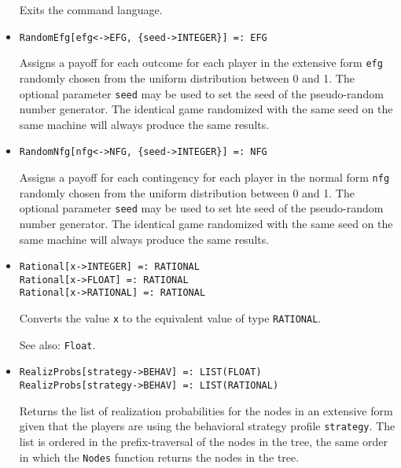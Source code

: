 \begin{itemize}
\bd
Exits the command language.
\ed


\item
\protect \large \begin{verbatim}
RandomEfg[efg<->EFG, {seed->INTEGER}] =: EFG
\end{verbatim}\normalsize

\bd
Assigns a payoff for each outcome for each player in the
extensive form \verb+efg+ randomly chosen from the uniform distribution
between 0 and 1.  The optional parameter \verb+seed+ may be used to
set the seed of the pseudo-random number generator.  The identical game
randomized with the same seed on the same machine will always produce
the same results.
\ed

\item
\protect \large \begin{verbatim}
RandomNfg[nfg<->NFG, {seed->INTEGER}] =: NFG
\end{verbatim}\normalsize

\bd
Assigns a payoff for each contingency for each player in
the normal form \verb+nfg+ randomly chosen from the uniform distribution
between 0 and 1.  The optional parameter \verb+seed+ may be used to
set hte seed of the pseudo-random number generator.  The identical game
randomized with the same seed on the same machine will always produce
the same results.
\ed

\item
\protect \large \begin{verbatim}
Rational[x->INTEGER] =: RATIONAL
Rational[x->FLOAT] =: RATIONAL
Rational[x->RATIONAL] =: RATIONAL
\end{verbatim} \normalsize

\bd
Converts the value \verb+x+ to the equivalent value of
type {\tt RATIONAL}.
\item
[See also:] {\tt Float}.
\ed

\item
\protect \large \begin{verbatim}
RealizProbs[strategy->BEHAV] =: LIST(FLOAT)
RealizProbs[strategy->BEHAV] =: LIST(RATIONAL)
\end{verbatim}\normalsize

\bd
Returns the list of realization probabilities for the
nodes in an extensive form given that the players are using the behavioral
strategy profile \verb+strategy+.  The list is ordered in the prefix-traversal
of the nodes in the tree, the same order in which the {\tt Nodes} function
returns the nodes in the tree.
\ed


\end{itemize}
